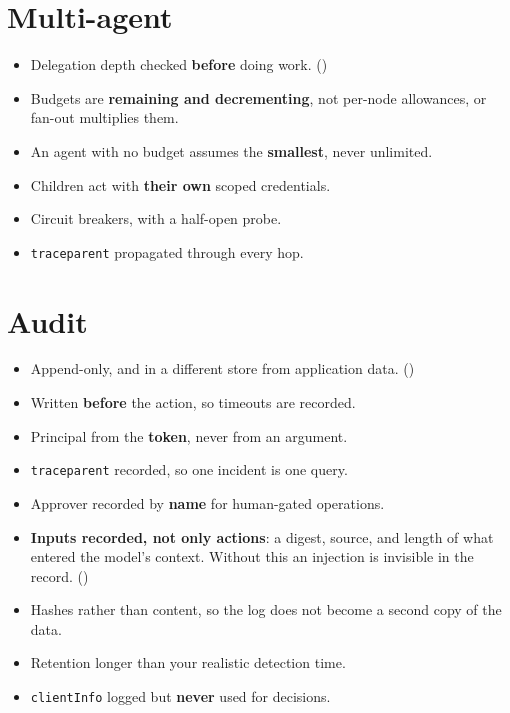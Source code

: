 \section{Multi-agent}

\begin{itemize}[leftmargin=1.6em, itemsep=3pt]
\item[$\square$] Delegation depth checked \textbf{before} doing work.
()
\item[$\square$] Budgets are \textbf{remaining and decrementing}, not per-node
allowances, or fan-out multiplies them.
\item[$\square$] An agent with no budget assumes the \textbf{smallest}, never
unlimited.
\item[$\square$] Children act with \textbf{their own} scoped credentials.
\item[$\square$] Circuit breakers, with a half-open probe.
\item[$\square$] \texttt{traceparent} propagated through every hop.
\end{itemize}

\section{Audit}

\begin{itemize}[leftmargin=1.6em, itemsep=3pt]
\item[$\square$] Append-only, and in a different store from application data.
()
\item[$\square$] Written \textbf{before} the action, so timeouts are recorded.
\item[$\square$] Principal from the \textbf{token}, never from an argument.
\item[$\square$] \texttt{traceparent} recorded, so one incident is one query.
\item[$\square$] Approver recorded by \textbf{name} for human-gated operations.
\item[$\square$] \textbf{Inputs recorded, not only actions}: a digest, source, and
length of what entered the model's context. Without this an injection is
invisible in the record. ()
\item[$\square$] Hashes rather than content, so the log does not become a second
copy of the data.
\item[$\square$] Retention longer than your realistic detection time.
\item[$\square$] \texttt{clientInfo} logged but \textbf{never} used for
decisions.
\end{itemize}

